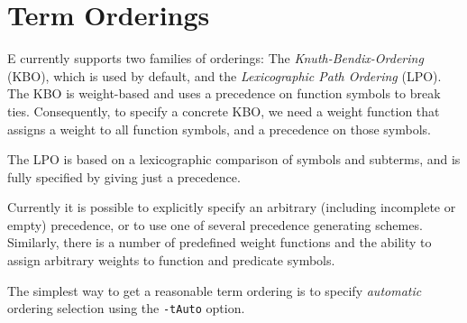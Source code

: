 \documentclass{report}
\begin{document}
\section{Term Orderings}
\label{sec:options:orderings}

E currently supports two families of orderings: The
\emph{Knuth-Bendix-Ordering} (KBO), which is used by default, and the
\emph{Lexicographic Path Ordering} (LPO). The KBO is weight-based
and uses a precedence on function symbols to break ties. Consequently,
to specify a concrete KBO, we need a weight function that assigns a
weight to all function symbols, and a precedence on those symbols.

The LPO is based on a lexicographic comparison of symbols and
subterms, and is fully specified by giving just a precedence.

Currently it is possible to explicitly specify an arbitrary (including
incomplete or empty) precedence, or to use one of several precedence
generating schemes. Similarly, there is a number of predefined weight
functions and the ability to assign arbitrary weights to function and
predicate symbols.

The simplest way to get a reasonable term ordering is to specify
\emph{automatic} ordering selection using the \texttt{-tAuto} option.
\end{document}

